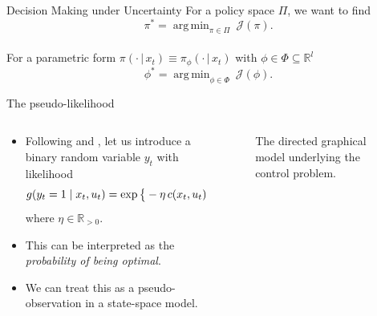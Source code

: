 \documentclass[10pt, aspectratio=1610]{beamer}
\DeclareMathOperator*{\argmin}{arg\,min}
\newcommand{\given}{\,|\,}
\begin{document}
    \begin{frame}{Decision Making under Uncertainty}
        For a policy space $\Pi$, we want to find
        \begin{equation*}
            \pi^{*} = \argmin_{\pi \in \Pi} \medspace \mathcal{J}(\pi).
        \end{equation*}
        ~ \\
        For a parametric form $\pi(\cdot \given x_t) \equiv \pi_{\phi}(\cdot \given x_t)$ with $\phi \in \Phi \subseteq \mathbb{R}^{l}$
        \begin{equation*}
            \phi^{*} = \argmin_{\phi \in \Phi} \medspace \mathcal{J}(\phi).
        \end{equation*}
    \end{frame}

    \begin{frame}{The pseudo-likelihood}
      \begin{columns}
        \begin{column}{0.6\textwidth}
          \begin{itemize}
            \item Following \citet{toussaint2006probabilistic} and \citet{rawlik2013probabilistic}, let us introduce a binary random variable $y_t$ with likelihood
              \begin{equation}
                \smash{g(y_t = 1 \mid x_t, u_t) = \exp \big\{-\eta \, c(x_t, u_t)\big\}},
              \end{equation}
              where $\eta \in \mathbb{R}_{>0}$.
            \item This can be interpreted as the \emph{probability of being optimal}.
            \item We can treat this as a pseudo-observation in a state-space model.
          \end{itemize}
        \end{column}
        \begin{column}{0.4\textwidth}
          \begin{figure}[htbp]
            \label{fig:dgm}
            \centering
            
            \caption{The directed graphical model underlying the control problem.}
          \end{figure}
        \end{column}
      \end{columns}
    \end{frame}
\end{document}
